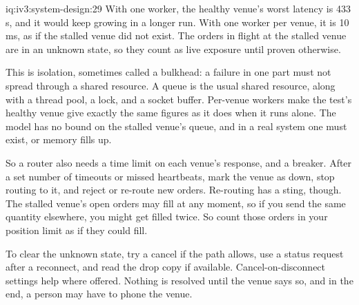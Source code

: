 \begin{solution}{iq:iv3:system-design:29}
With one worker, the healthy venue's worst latency is 433 s, and it would keep growing in a longer run. With one worker per venue, it is 10 ms, as if the stalled venue did not exist. The orders in flight at the stalled venue are in an unknown state, so they count as live exposure until proven otherwise.
\label{lst:iv3:sd:bulkhead}

This is isolation, sometimes called a bulkhead: a failure in one part must not spread through a shared resource. A queue is the usual shared resource, along with a thread pool, a lock, and a socket buffer. Per-venue workers make the test's healthy venue give exactly the same figures as it does when it runs alone. The model has no bound on the stalled venue's queue, and in a real system one must exist, or memory fills up.

So a router also needs a time limit on each venue's response, and a breaker. After a set number of timeouts or missed heartbeats, mark the venue as down, stop routing to it, and reject or re-route new orders. Re-routing has a sting, though. The stalled venue's open orders may fill at any moment, so if you send the same quantity elsewhere, you might get filled twice. So count those orders in your position limit as if they could fill.

To clear the unknown state, try a cancel if the path allows, use a status request after a reconnect, and read the drop copy if available. Cancel-on-disconnect settings help where offered. Nothing is resolved until the venue says so, and in the end, a person may have to phone the venue.

\end{solution}

